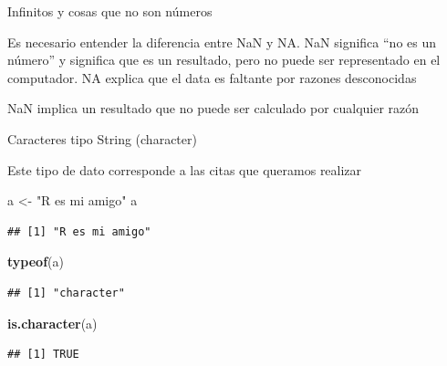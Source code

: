 \documentclass[ignorenonframetext,]{beamer}
\newenvironment{Shaded}{\begin{snugshade}}{\end{snugshade}}
\newcommand{\KeywordTok}[1]{\textcolor[rgb]{0.13,0.29,0.53}{\textbf{#1}}}
\newcommand{\StringTok}[1]{\textcolor[rgb]{0.31,0.60,0.02}{#1}}
\newcommand{\NormalTok}[1]{#1}
\begin{document}
\begin{frame}{Infinitos y cosas que no son números}

Es necesario entender la diferencia entre NaN y NA. NaN significa ``no
es un número'' y significa que es un resultado, pero no puede ser
representado en el computador. NA explica que el data es faltante por
razones desconocidas

NaN implica un resultado que no puede ser calculado por cualquier razón

\end{frame}

\begin{frame}[fragile]{Caracteres tipo String (character)}

Este tipo de dato corresponde a las citas que queramos realizar

\begin{Shaded}
\begin{Highlighting}[]
\NormalTok{a <-}\StringTok{ "R es mi amigo"}
\NormalTok{a}
\end{Highlighting}
\end{Shaded}

\begin{verbatim}
## [1] "R es mi amigo"
\end{verbatim}

\begin{Shaded}
\begin{Highlighting}[]
\KeywordTok{typeof}\NormalTok{(a)}
\end{Highlighting}
\end{Shaded}

\begin{verbatim}
## [1] "character"
\end{verbatim}

\begin{Shaded}
\begin{Highlighting}[]
\KeywordTok{is.character}\NormalTok{(a)}
\end{Highlighting}
\end{Shaded}

\begin{verbatim}
## [1] TRUE
\end{verbatim}

\end{frame}
\end{document}
